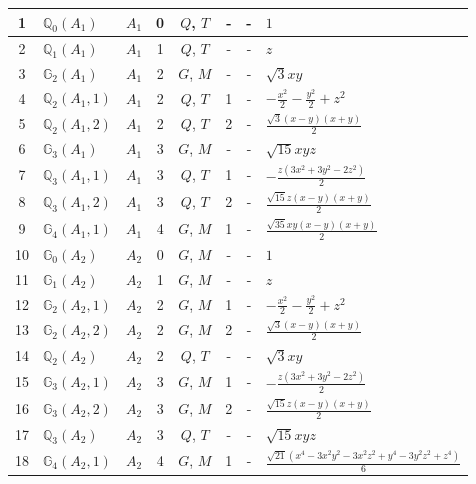 \documentclass[fleqn,10pt,landscape]{jsarticle}
\begin{document}
\begin{longtable}[l]{clcccccl}
1 & $\mathbb{Q}_{0}(A_{1})$ & $A_{1}$ & 0 & $Q$, $T$ & - & - & $1$ \\ \hline
2 & $\mathbb{Q}_{1}(A_{1})$ & $A_{1}$ & 1 & $Q$, $T$ & - & - & $z$ \\ \hline
3 & $\mathbb{G}_{2}(A_{1})$ & $A_{1}$ & 2 & $G$, $M$ & - & - & $\sqrt{3} x y$ \\ \hline
4 & $\mathbb{Q}_{2}(A_{1},1)$ & $A_{1}$ & 2 & $Q$, $T$ & 1 & - & $- \frac{x^{2}}{2} - \frac{y^{2}}{2} + z^{2}$ \\ \hline
5 & $\mathbb{Q}_{2}(A_{1},2)$ & $A_{1}$ & 2 & $Q$, $T$ & 2 & - & $\frac{\sqrt{3} \left(x - y\right) \left(x + y\right)}{2}$ \\ \hline
6 & $\mathbb{G}_{3}(A_{1})$ & $A_{1}$ & 3 & $G$, $M$ & - & - & $\sqrt{15} x y z$ \\ \hline
7 & $\mathbb{Q}_{3}(A_{1},1)$ & $A_{1}$ & 3 & $Q$, $T$ & 1 & - & $- \frac{z \left(3 x^{2} + 3 y^{2} - 2 z^{2}\right)}{2}$ \\ \hline
8 & $\mathbb{Q}_{3}(A_{1},2)$ & $A_{1}$ & 3 & $Q$, $T$ & 2 & - & $\frac{\sqrt{15} z \left(x - y\right) \left(x + y\right)}{2}$ \\ \hline
9 & $\mathbb{G}_{4}(A_{1},1)$ & $A_{1}$ & 4 & $G$, $M$ & 1 & - & $\frac{\sqrt{35} x y \left(x - y\right) \left(x + y\right)}{2}$ \\ \hline
10 & $\mathbb{G}_{0}(A_{2})$ & $A_{2}$ & 0 & $G$, $M$ & - & - & $1$ \\ \hline
11 & $\mathbb{G}_{1}(A_{2})$ & $A_{2}$ & 1 & $G$, $M$ & - & - & $z$ \\ \hline
12 & $\mathbb{G}_{2}(A_{2},1)$ & $A_{2}$ & 2 & $G$, $M$ & 1 & - & $- \frac{x^{2}}{2} - \frac{y^{2}}{2} + z^{2}$ \\ \hline
13 & $\mathbb{G}_{2}(A_{2},2)$ & $A_{2}$ & 2 & $G$, $M$ & 2 & - & $\frac{\sqrt{3} \left(x - y\right) \left(x + y\right)}{2}$ \\ \hline
14 & $\mathbb{Q}_{2}(A_{2})$ & $A_{2}$ & 2 & $Q$, $T$ & - & - & $\sqrt{3} x y$ \\ \hline
15 & $\mathbb{G}_{3}(A_{2},1)$ & $A_{2}$ & 3 & $G$, $M$ & 1 & - & $- \frac{z \left(3 x^{2} + 3 y^{2} - 2 z^{2}\right)}{2}$ \\ \hline
16 & $\mathbb{G}_{3}(A_{2},2)$ & $A_{2}$ & 3 & $G$, $M$ & 2 & - & $\frac{\sqrt{15} z \left(x - y\right) \left(x + y\right)}{2}$ \\ \hline
17 & $\mathbb{Q}_{3}(A_{2})$ & $A_{2}$ & 3 & $Q$, $T$ & - & - & $\sqrt{15} x y z$ \\ \hline
18 & $\mathbb{G}_{4}(A_{2},1)$ & $A_{2}$ & 4 & $G$, $M$ & 1 & - & $\frac{\sqrt{21} \left(x^{4} - 3 x^{2} y^{2} - 3 x^{2} z^{2} + y^{4} - 3 y^{2} z^{2} + z^{4}\right)}{6}$ \\ \hline

\end{longtable}
\end{document}
